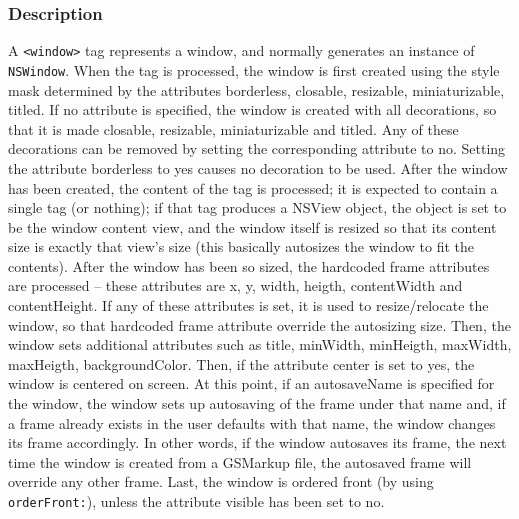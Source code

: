 \subsubsection{Description}
A \texttt{<window>} tag represents a window, and normally generates an
instance of \texttt{NSWindow}.  When the tag is processed, the window
is first created using the style mask determined by the attributes
borderless, closable, resizable, miniaturizable, titled.  If no
attribute is specified, the window is created with all decorations, so
that it is made closable, resizable, miniaturizable and titled.  Any
of these decorations can be removed by setting the corresponding
attribute to no.  Setting the attribute borderless to yes causes no
decoration to be used.  After the window has been created, the content
of the tag is processed; it is expected to contain a single tag (or
nothing); if that tag produces a NSView object, the object is set to
be the window content view, and the window itself is resized so that
its content size is exactly that view's size (this basically autosizes
the window to fit the contents).  After the window has been so sized,
the hardcoded frame attributes are processed -- these attributes are
x, y, width, heigth, contentWidth and contentHeight.  If any of these
attributes is set, it is used to resize/relocate the window, so that
hardcoded frame attribute override the autosizing size.  Then, the
window sets additional attributes such as title, minWidth, minHeigth,
maxWidth, maxHeigth, backgroundColor.  Then, if the attribute center
is set to yes, the window is centered on screen.  At this point, if an
autosaveName is specified for the window, the window sets up
autosaving of the frame under that name and, if a frame already exists
in the user defaults with that name, the window changes its frame
accordingly.  In other words, if the window autosaves its frame, the
next time the window is created from a GSMarkup file, the autosaved frame
will override any other frame.  Last, the window is ordered front (by
using \texttt{orderFront:}), unless the attribute visible has been set
to no.

